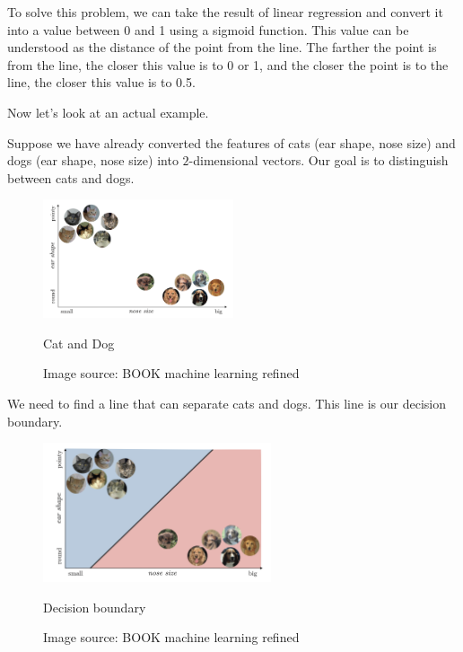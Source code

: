 \documentclass[oneside]{book}
\begin{document}
To solve this problem, we can take the result of linear regression and convert it into a value between 0 and 1 using a sigmoid function. 
This value can be understood as the distance of the point from the line.
The farther the point is from the line, the closer this value is to 0 or 1, and the closer the point is to the line, the closer this value is to 0.5.

Now let's look at an actual example.

Suppose we have already converted the features of cats (ear shape, nose size) and dogs (ear shape, nose size) into $2$-dimensional vectors. Our goal is to distinguish between cats and dogs.
\begin{figure}[H]
        \centering
        \includegraphics[width=0.5\textwidth]{images/feature embedding.png}
        \caption{Cat and Dog}
        \caption*{Image source: BOOK machine learning refined}
\end{figure}
We need to find a line that can separate cats and dogs. This line is our decision boundary.
\begin{figure}[H]
        \centering
        \includegraphics[width=0.6\textwidth]{images/decision boundary.png}
        \caption{Decision boundary}
        \caption*{Image source: BOOK machine learning refined}
\end{figure}
\end{document}
